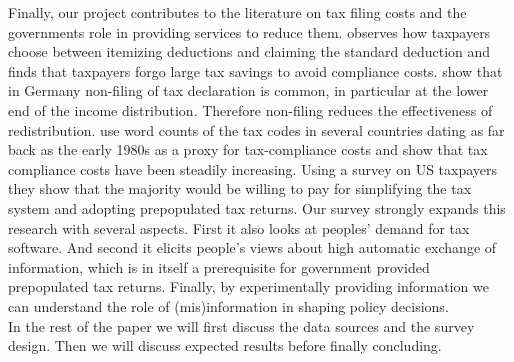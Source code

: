 \documentclass[11pt]{article}
\begin{document}
Finally, our project contributes to the literature on tax filing costs and the governments role in providing services to reduce them. \textcite{benzarti2020taxing} observes how taxpayers choose between itemizing deductions and claiming the standard deduction and finds that taxpayers forgo large tax savings to avoid compliance costs. \textcite{hauck2024optional} show that in Germany non-filing of tax declaration is common, in particular at the lower end of the income distribution. Therefore non-filing reduces the effectiveness of redistribution. \textcite{benzarti2024rising} use word counts of the tax codes in several countries dating as far back as the early 1980s as a proxy for tax-compliance costs and show that tax compliance costs have been steadily increasing. Using a survey on US taxpayers they show that the majority would be willing to pay for simplifying the tax system and adopting prepopulated tax returns. Our survey strongly expands this research with several aspects. First it also looks at peoples' demand for tax software. And second it elicits people's views about high automatic exchange of information, which is in itself a prerequisite for government provided prepopulated tax returns. Finally, by experimentally providing information we can understand the role of (mis)information in shaping policy decisions.  \\[-0.5em] 

In the rest of the paper we will first discuss the data sources and the survey design. Then we will discuss expected results before finally concluding. 
\end{document}
